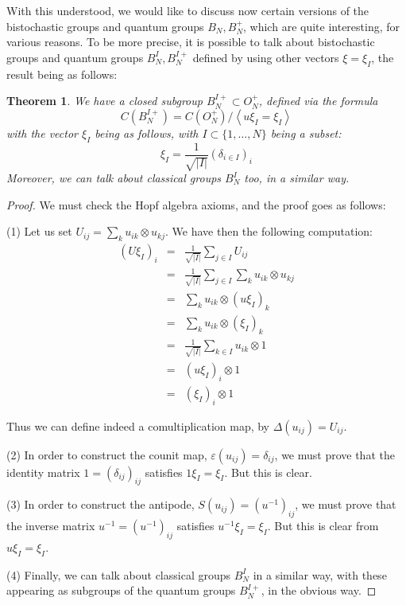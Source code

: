 \documentclass[12pt]{amsbook}
\newtheorem{theorem}{Theorem}[chapter]
\begin{document}
With this understood, we would like to discuss now certain versions of the bistochastic groups and quantum groups $B_N,B_N^+$, which are quite interesting, for various reasons. To be more precise, it is possible to talk about bistochastic groups and quantum groups $B_N^I,B_N^{I+}$ defined by using other vectors $\xi=\xi_I$, the result being as follows:

\begin{theorem}
We have a closed subgroup $B_N^{I+}\subset O_N^+$, defined via the formula
$$C(B_N^{I+})=C(O_N^+)\Big/\left<u\xi_I=\xi_I\right>$$
with the vector $\xi_I$ being as follows, with $I\subset\{1,\ldots,N\}$ being a subset:
$$\xi_I=\frac{1}{\sqrt{|I|}}(\delta_{i\in I})_i$$
Moreover, we can talk about classical groups $B_N^I$ too, in a similar way.
\end{theorem}

\begin{proof}
We must check the Hopf algebra axioms, and the proof goes as follows:

\medskip

(1) Let us set $U_{ij}=\sum_ku_{ik}\otimes u_{kj}$. We have then the following computation:
\begin{eqnarray*}
(U\xi_I)_i
&=&\frac{1}{\sqrt{|I|}}\sum_{j\in I}U_{ij}\\
&=&\frac{1}{\sqrt{|I|}}\sum_{j\in I}\sum_ku_{ik}\otimes u_{kj}\\
&=&\sum_ku_{ik}\otimes(u\xi_I)_k\\
&=&\sum_ku_{ik}\otimes(\xi_I)_k\\
&=&\frac{1}{\sqrt{|I|}}\sum_{k\in I}u_{ik}\otimes1\\
&=&(u\xi_I)_i\otimes1\\
&=&(\xi_I)_i\otimes1
\end{eqnarray*}

Thus we can define indeed a comultiplication map, by $\Delta(u_{ij})=U_{ij}$.

\medskip

(2) In order to construct the counit map, $\varepsilon(u_{ij})=\delta_{ij}$, we must prove that the identity matrix $1=(\delta_{ij})_{ij}$ satisfies $1\xi_I=\xi_I$. But this is clear.

\medskip

(3) In order to construct the antipode, $S(u_{ij})=(u^{-1})_{ij}$, we must prove that the inverse matrix $u^{-1}=(u^{-1})_{ij}$ satisfies $u^{-1}\xi_I=\xi_I$. But this is clear from $u\xi_I=\xi_I$.

\medskip

(4) Finally, we can talk about classical groups $B_N^I$ in a similar way, with these appearing as subgroups of the quantum groups $B_N^{I+}$, in the obvious way. 
\end{proof}
\end{document}
